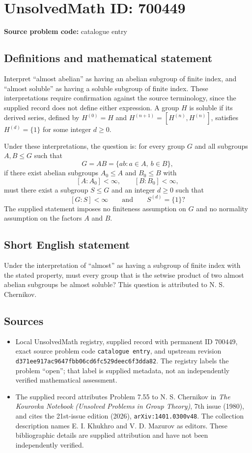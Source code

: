 \documentclass[11pt]{article}
\begin{document}
\section*{UnsolvedMath ID: 700449}
\textbf{Source problem code:} catalogue entry
\subsection{Definitions and mathematical statement}
Interpret ``almost abelian'' as having an abelian subgroup of finite index, and ``almost soluble'' as having a soluble subgroup of finite index. These interpretations require confirmation against the source terminology, since the supplied record does not define either expression. A group \(H\) is soluble if its derived series, defined by \(H^{(0)}=H\) and \(H^{(n+1)}=[H^{(n)},H^{(n)}]\), satisfies \(H^{(d)}=\{1\}\) for some integer \(d\geq 0\).

Under these interpretations, the question is: for every group \(G\) and all subgroups \(A,B\leq G\) such that
\[
G=AB=\{ab:a\in A,\ b\in B\},
\]
if there exist abelian subgroups \(A_0\leq A\) and \(B_0\leq B\) with
\[
[A:A_0]<\infty,\qquad [B:B_0]<\infty,
\]
must there exist a subgroup \(S\leq G\) and an integer \(d\geq 0\) such that
\[
[G:S]<\infty\qquad\text{and}\qquad S^{(d)}=\{1\}?
\]
The supplied statement imposes no finiteness assumption on \(G\) and no normality assumption on the factors \(A\) and \(B\).
\subsection{Short English statement}
Under the interpretation of ``almost'' as having a subgroup of finite index with the stated property, must every group that is the setwise product of two almost abelian subgroups be almost soluble? This question is attributed to N. S. Chernikov.
\subsection{Sources}
\begin{itemize}
\item Local UnsolvedMath registry, supplied record with permanent ID \(700449\), exact source problem code \texttt{catalogue entry}, and upstream revision \texttt{d371ee917ac9647fbb06cd6fc529deec6f3dda82}. The registry labels the problem ``open''; that label is supplied metadata, not an independently verified mathematical assessment.
\item The supplied record attributes Problem 7.55 to N. S. Chernikov in \emph{The Kourovka Notebook (Unsolved Problems in Group Theory)}, 7th issue (1980), and cites the 21st-issue edition (2026), \texttt{arXiv:1401.0300v48}. The collection description names E. I. Khukhro and V. D. Mazurov as editors. These bibliographic details are supplied attribution and have not been independently verified.
\end{itemize}
\end{document}
